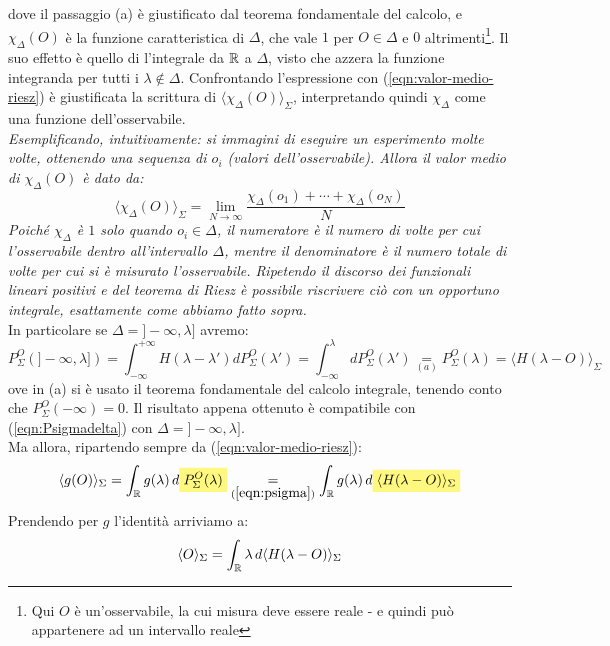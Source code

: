 \documentclass[FisicaTeorica.tex]{subfiles}
\begin{document}
dove il passaggio (a) è giustificato dal teorema fondamentale del calcolo, e $\chi_\Delta(O)$ è la funzione caratteristica di $\Delta$, che vale $1$ per $O \in \Delta$ e $0$ altrimenti\footnote{Qui $O$ è un'osservabile, la cui misura deve essere reale - e quindi può appartenere ad un intervallo reale}. Il suo effetto è quello di  l'integrale da $\mathbb{R}$ a $\Delta$, visto che azzera la funzione integranda per tutti i $\lambda \notin \Delta$. Confrontando l'espressione con (\ref{eqn:valor-medio-riesz}) è giustificata la scrittura di $\langle \chi_\Delta(O)\rangle_\Sigma$, interpretando quindi $\chi_\Delta$ come una funzione dell'osservabile.\\
\textit{Esemplificando, intuitivamente: si immagini di eseguire un esperimento molte volte, ottenendo una sequenza di $o_i$ (valori dell'osservabile). Allora il valor medio di $\chi_\Delta(O)$ è dato da:}
\[
\langle \chi_\Delta(O)\rangle_\Sigma = \lim_{N\to \infty} \frac{\chi_\Delta(o_1) + \cdots + \chi_\Delta(o_N)}{N}
\]
\textit{Poiché $\chi_\Delta$ è $1$ solo quando $o_i \in \Delta$, il numeratore è il numero di volte per cui l'osservabile  dentro all'intervallo $\Delta$, mentre il denominatore è il numero totale di volte per cui si è misurato l'osservabile. Ripetendo il discorso dei funzionali lineari positivi e del teorema di Riesz è possibile riscrivere ciò con un opportuno integrale, esattamente come abbiamo fatto sopra.}\\
In particolare se $\Delta= ]-\infty, \lambda]$ avremo:
\begin{equation}
P_\Sigma^O(]-\infty,\lambda]) =
\int_{-\infty}^{+\infty} H(\lambda - \lambda') dP^O_\Sigma(\lambda') =
\int_{-\infty}^\lambda dP_\Sigma^O(\lambda') \underset{(a)}{=} P_\Sigma^O(\lambda) = \langle H(\lambda-O)\rangle_\Sigma
\label{eqn:psigma}
\end{equation}
ove in (a) si è usato il teorema fondamentale del calcolo integrale, tenendo conto che $P^O_\Sigma(-\infty) = 0$.
Il risultato appena ottenuto è compatibile con (\ref{eqn:Psigmadelta}) con $\Delta = ]-\infty,\lambda]$.
\\
Ma allora, ripartendo sempre da (\ref{eqn:valor-medio-riesz}):
\[
\langle g(O) \rangle_\Sigma = \int_\bb{R} g(\lambda)\, d\hlc{Yellow}{P_\Sigma^O(\lambda)} \underset{(\ref{eqn:psigma})}{=} \int_\bb{R} g(\lambda)\, d\hlc{Yellow}{\langle H(\lambda-O)\rangle_\Sigma}
\]
Prendendo per $g$ l'identità arriviamo a:
\begin{equation}
\langle O \rangle_\Sigma = \int_{\mathbb{R}} \lambda\, d\langle H(\lambda-O)\rangle_\Sigma
\label{eqn:Omedio}
\end{equation}
\end{document}
